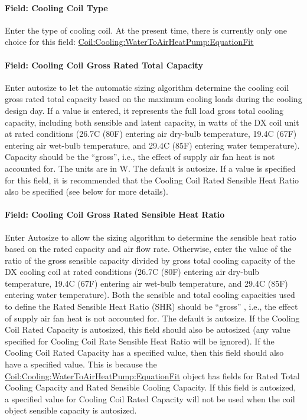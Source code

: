 \paragraph{Field: Cooling Coil Type}\label{field-cooling-coil-type-3}

Enter the type of cooling coil. At the present time, there is currently only one choice for this field:
 \hyperref[coilcoolingwatertoairheatpumpequationfit]{Coil:Cooling:WaterToAirHeatPump:EquationFit}

\paragraph{Field: Cooling Coil Gross Rated Total Capacity}\label{field-cooling-coil-gross-rated-total-capacity-2}

Enter autosize to let the automatic sizing algorithm determine the cooling coil gross rated total capacity based on the maximum cooling loads during the cooling design day. If a value is entered, it represents the full load gross total cooling capacity, including both sensible and latent capacity, in watts of the DX coil unit at rated conditions (26.7C (80F) entering air dry-bulb temperature, 19.4C (67F) entering air wet-bulb temperature, and 29.4C (85F) entering water temperature). Capacity should be the ``gross'', i.e., the effect of supply air fan heat is not accounted for. The units are in W. The default is autosize. If a value is specified for this field, it is recommended that the Cooling Coil Rated Sensible Heat Ratio also be specified (see below for more details).

\paragraph{Field: Cooling Coil Gross Rated Sensible Heat Ratio}\label{field-cooling-coil-gross-rated-sensible-heat-ratio-2}

Enter Autosize to allow the sizing algorithm to determine the sensible heat ratio based on the rated capacity and air flow rate. Otherwise, enter the value of the ratio of the gross sensible capacity divided by gross total cooling capacity of the DX cooling coil at rated conditions (26.7C (80F) entering air dry-bulb temperature, 19.4C (67F) entering air wet-bulb temperature, and 29.4C (85F) entering water temperature). Both the sensible and total cooling capacities used to define the Rated Sensible Heat Ratio (SHR) should be ``gross'' , i.e., the effect of supply air fan heat is not accounted for. The default is autosize. If the Cooling Coil Rated Capacity is autosized, this field should also be autosized (any value specified for Cooling Coil Rate Sensible Heat Ratio will be ignored). If the Cooling Coil Rated Capacity has a specified value, then this field should also have a specified value. This is because the \hyperref[coilcoolingwatertoairheatpumpequationfit]{Coil:Cooling:WaterToAirHeatPump:EquationFit} object has fields for Rated Total Cooling Capacity and Rated Sensible Cooling Capacity. If this field is autosized, a specified value for Cooling Coil Rated Capacity will not be used when the coil object sensible capacity is autosized.

